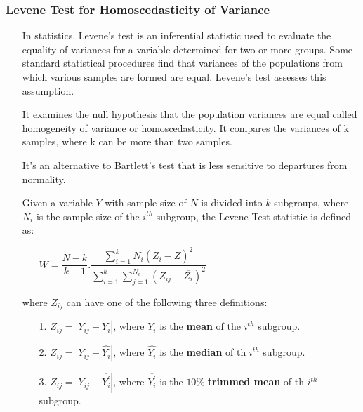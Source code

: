 \documentclass[a4paper]{article}
\begin{document}
\subsubsection{Levene Test for Homoscedasticity of Variance}
\begin{itemize}
    \item[] In statistics, Levene’s test is an inferential statistic used to evaluate the equality of variances for a variable determined for two or more groups. Some standard statistical procedures find that variances of the populations from which various samples are formed are equal. Levene’s test assesses this assumption.
    
    \item[] It examines the null hypothesis that the population variances are equal called homogeneity of variance or homoscedasticity. It compares the variances of k samples, where k can be more than two samples.
    
    \item[] It’s an alternative to Bartlett’s test that is less sensitive to departures from normality.
    
    \item[] Given a variable $Y$ with sample size of $N$ is divided into $k$ subgroups, where $N_i$ is the sample size of the $i^{th}$ subgroup, the Levene Test statistic is defined as:
    \begin{itemize}
        \large
        \centering
        \item[] $W = \dfrac{N-k}{k-1}.\dfrac{\sum_{i=1}^{k} N_i(\overline{Z_i}-\overline{Z})^2}{\sum_{i=1}^{k} \sum_{j=1}^{N_i}(Z_{ij}-\overline{Z_i})^2}$
    \end{itemize}
    
    \item[] where $Z_{ij}$ can have one of the following three definitions:
    \begin{itemize}
        \item[1.] $Z_{ij} = \left| Y_{ij} - \overline{Y_i} \right|$, where $\overline{Y_i}$ is the \textbf{mean} of the $i^{th}$ subgroup.
        
        \item[2.] $Z_{ij} = \left| Y_{ij} - \hat{Y_i} \right|$, where $\hat{Y_i}$ is the \textbf{median} of th $i^{th}$ subgroup.
        
        \item[3.] $Z_{ij} = \left| Y_{ij} - \overline{Y_i^{'}} \right|$, where $\overline{Y_i^{'}}$ is the $10 \%$ \textbf{trimmed mean} of th $i^{th}$ subgroup.
    \end{itemize}
    

\end{itemize}
\end{document}
